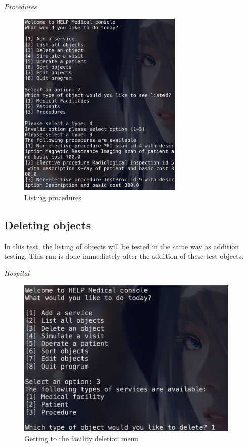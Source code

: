 \documentclass{article}
\begin{document}
	\textit{Procedures}
	\begin{figure}
		\begin{center}
			\includegraphics[width=0.7\textwidth]{figures/Listing/Listing_Procedures.png}
		\end{center}
		\caption{Listing procedures}\label{fig:listing_procedures}
	\end{figure}

	\subsection{Deleting objects}\label{sub:deleting_objects} %
	In this test, the listing of objects will be tested in the same way as addition testing. This run is done immediately after the addition of these test objects.

	\textit{Hospital}
	\begin{figure}
		\begin{center}
			\includegraphics[width=0.95\textwidth]{figures/Deleting/Deleting_Hospital_01.png}
		\end{center}
		\caption{Getting to the facility deletion menu}\label{fig:deleting_hospital_01}
	\end{figure}
	
\end{document}
